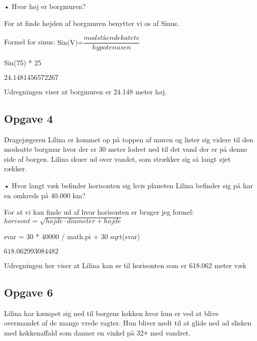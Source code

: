 \documentclass[
  a4paper,
]{article}
\newenvironment{Shaded}{\begin{snugshade}}{\end{snugshade}}
\newcommand{\DecValTok}[1]{\textcolor[rgb]{0.68,0.00,0.00}{#1}}
\newcommand{\NormalTok}[1]{\textcolor[rgb]{0.00,0.23,0.31}{#1}}
\newcommand{\OperatorTok}[1]{\textcolor[rgb]{0.37,0.37,0.37}{#1}}
\begin{document}
• Hvor høj er borgmuren?

For at finde højden af borgmuren benytter vi os af Sinus.

Formel for sinus:
\(\text{Sin(V)=}\dfrac{modstående katete}{hypotenusen}\)

\begin{Shaded}
\begin{Highlighting}[]
\NormalTok{Sin(}\DecValTok{75}\NormalTok{) }\OperatorTok{*} \DecValTok{25}
\end{Highlighting}
\end{Shaded}

$\displaystyle 24.1481456572267$

Udregningen viser at borgmuren er 24.148 meter høj.

\hypertarget{opgave-4}{%
\subsection{Opgave 4}\label{opgave-4}}

Dragejægeren Lilina er kommet op på toppen af muren og lister sig videre
til den modsatte borgmur hvor der er 30 meter lodret ned til det vand
der er på denne side af borgen. Lilina skuer ud over vandet, som
strækker sig så langt øjet rækker.

• Hvor langt væk befinder horisonten sig hvis planeten Lilina befinder
sig på har en omkreds på 40.000 km?

For at vi kan finde ud af hvor horisonten er bruger jeg formel:
\(horisont = \sqrt{højde \cdot diameter + højde}\)

\begin{Shaded}
\begin{Highlighting}[]
\NormalTok{svar }\OperatorTok{=} \DecValTok{30} \OperatorTok{*} \DecValTok{40000} \OperatorTok{/}\NormalTok{ math.pi }\OperatorTok{+} \DecValTok{30}
\NormalTok{sqrt(svar)}
\end{Highlighting}
\end{Shaded}

$\displaystyle 618.062993084482$

Udregningen her viser at Lilina kan se til horisonten som er 618.062
meter væk

\hypertarget{opgave-6}{%
\subsection{Opgave 6}\label{opgave-6}}

Lilina har kæmpet sig ned til borgens køkken hvor hun er ved at blive
overmandet af de mange vrede vagter. Hun bliver nødt til at glide ned ad
slisken med køkkenaffald som danner en vinkel på 32∘ med vandret.
\end{document}
